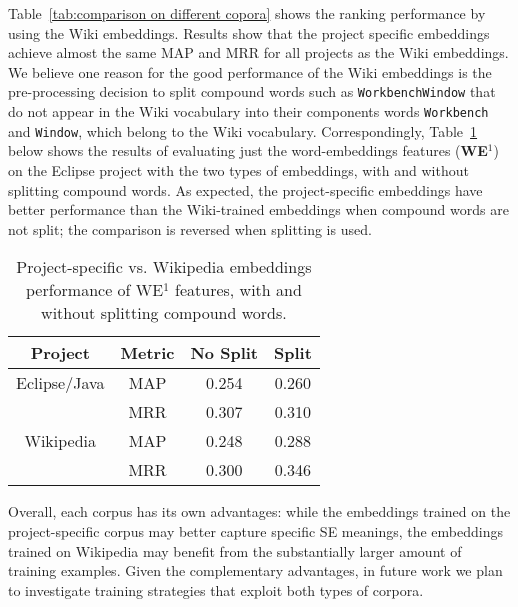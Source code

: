 Table~\ref{tab:comparison on different copora} shows the ranking performance by using the Wiki embeddings. Results show that the project specific embeddings achieve almost the same MAP and MRR for all projects as the Wiki embeddings. We believe one reason for the good performance of the Wiki embeddings is the pre-processing decision to split compound words such as {\tt WorkbenchWindow} that do not appear in the Wiki vocabulary into their components words {\tt Workbench} and {\tt Window}, which belong to the Wiki vocabulary. Correspondingly, Table~\ref{tab:wiki-vs-eclipse} below shows the results of evaluating just the word-embeddings features ({\bf WE}$^1$) on the Eclipse project with the two types of embeddings, with and without splitting compound words. As expected, the project-specific embeddings have better performance than the Wiki-trained embeddings when compound words are not split; the comparison is reversed when splitting is used.
\begin{table}[h]
\centering
\caption{Project-specific vs. Wikipedia embeddings performance of WE$^1$ features, with and without splitting compound words.}
\begin{tabular}{|c|c|c|c|} \hline
Project & Metric & No Split & Split \\ \hline
Eclipse/Java& MAP & 0.254 & 0.260 \\
 & MRR & 0.307 & 0.310 \\ \hline
Wikipedia & MAP & 0.248 & 0.288 \\
& MRR & 0.300 & 0.346 \\ \hline
\end{tabular}
\label{tab:wiki-vs-eclipse}
\end{table}
Overall, each corpus has its own advantages: while the embeddings trained on the project-specific corpus may better capture specific SE meanings, the embeddings trained on Wikipedia may benefit from the substantially larger amount of training examples. Given the complementary advantages, in future work we plan to investigate training strategies that exploit both types of corpora.

